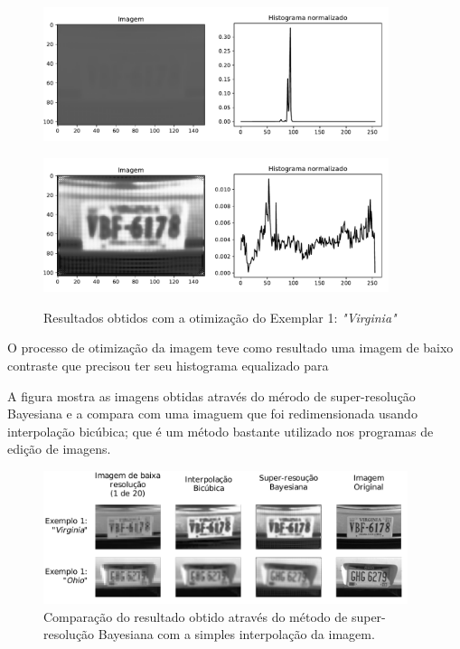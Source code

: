 \begin{figure}
	\centering
	\caption{Resultados obtidos com a otimização do Exemplar 1: \emph{"Virginia"}}
	\label{fig:result_histograms2}
	\begin{minipage}[b]{.99\linewidth}
		\includegraphics[width = 0.9\textwidth]{./figures/results_figures/histograma3.pdf}
		\label{fig:result_histograms2_output}
	\end{minipage}	

	\begin{minipage}[b]{.99\linewidth}
		\includegraphics[width = 0.9\textwidth]{./figures/results_figures/histograma4.pdf}
		\label{fig:result_histograms2_equalized}
	\end{minipage}	
	
\end{figure}

O processo de otimização da imagem teve como resultado uma imagem de baixo contraste que precisou ter seu histograma equalizado para 

A figura \label{fig:results_compare} mostra as imagens obtidas através do mérodo de super-resolução Bayesiana e a compara com uma imaguem que foi redimensionada usando interpolação bicúbica; que é um método bastante utilizado nos programas de edição de imagens.

\begin{figure}[H]
	\centering
	\caption{Comparação do resultado obtido através do método de super-resolução Bayesiana com a simples interpolação da imagem.}
	\label{fig:results_compare}
	\includegraphics[width = 0.95\textwidth]{./figures/results_figures/result_compare.pdf}
\end{figure}


